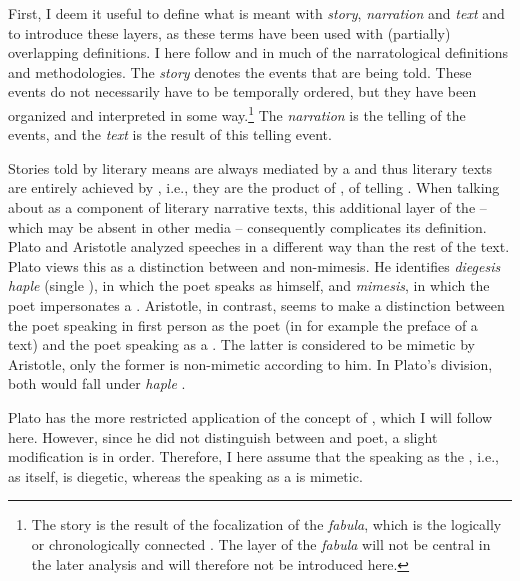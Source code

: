 \documentclass[output=paper,colorlinks,citecolor=brown]{langscibook}
\begin{document}
First, I deem it useful to define what is meant with \textit{story}, \textit{narration} and \textit{text} and to introduce these layers, as these terms have been used with (partially) overlapping definitions. I here follow \citet{Bal1985} and \citet{Jong2004} in much of the narratological definitions and methodologies. The \textit{story} denotes the events that are being told. These events do not necessarily have to be temporally ordered, but they have been organized and interpreted in some way.\footnote{The story is the result of the focalization of the \textit{fabula}, which is the logically or chronologically connected  \citep{Bal1985, Jong2004}. The layer of the \textit{fabula} will not be central in the later analysis and will therefore not be introduced here.} The \textit{narration} is the telling of the events, and the \textit{text} is the result of this telling event.

Stories told by literary means are always mediated by a  \citep[28]{Fludernik1993} and thus literary texts are entirely achieved by , i.e., they are the product of , of telling \citep[2--3]{Jong2004}. When talking about  as a component of literary narrative texts, this additional layer of the  -- which may be absent in other media -- consequently complicates its definition. Plato and Aristotle analyzed speeches in a different way than the rest of the text. Plato views this as a distinction between  and non-mimesis. He identifies \textit{diegesis haple} (single ), in which the poet speaks as himself, and \textit{mimesis}, in which the poet impersonates a . Aristotle, in contrast, seems to make a distinction between the poet speaking in first person as the poet (in for example the preface of a text) and the poet speaking as a . The latter is considered to be mimetic by Aristotle, only the former is non-mimetic according to him. In Plato's division, both would fall under \textit{ haple} \citep[6--8, 38]{Jong2004}.

Plato has the more restricted application of the concept of , which I will follow here. However, since he did not distinguish between  and poet, a slight modification is in order. Therefore, I here assume that the  speaking as the , i.e., as itself, is diegetic, whereas the  speaking as a  is mimetic.
\end{document}
